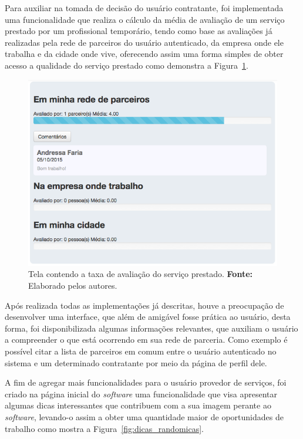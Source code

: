 \par Para auxiliar na tomada de decisão do usuário contratante, foi implementada uma funcionalidade que realiza o cálculo da média de avaliação de um serviço prestado por um profissional temporário, tendo como base as avaliações já realizadas pela rede de parceiros do usuário autenticado, da empresa onde ele trabalha e da cidade onde vive, oferecendo assim uma forma simples de obter acesso a qualidade do serviço prestado como demonstra a Figura~\ref{fig:taxa_avaliacao}.

\begin{figure}[h!]
	\centerline{\includegraphics[scale=0.45]{./imagens/taxa-avaliacao.png}}
	\caption[Tela contendo a taxa de avaliação do serviço prestado.]
	{Tela contendo a taxa de avaliação do serviço prestado. \textbf{Fonte:} Elaborado pelos autores.}
	\label{fig:taxa_avaliacao}
\end{figure}

\par Após realizada todas as implementações já descritas, houve a preocupação de desenvolver uma interface, que além de amigável fosse prática ao usuário, desta forma, foi disponibilizada algumas informações relevantes, que auxiliam o usuário a compreender o que está ocorrendo em sua rede de parceria. Como exemplo é possível citar a lista de parceiros em comum entre o usuário autenticado no sistema e um determinado contratante por meio da página de perfil dele.

\par A fim de agregar mais funcionalidades para o usuário provedor de serviços, foi criado na página inicial do \textit{software} uma funcionalidade que visa apresentar algumas dicas interessantes que contribuem com a sua imagem perante ao \textit{software}, levando-o assim a obter uma quantidade maior de oportunidades de trabalho como mostra a Figura~\ref{fig:dicas_randomicas}.

